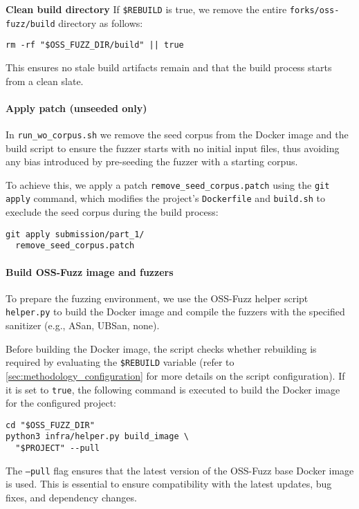\noindent \textbf{Clean build directory} If \texttt{\$REBUILD} is true, we remove the entire \texttt{forks/oss-fuzz/build} directory as follows:

\begin{verbatim}
rm -rf "$OSS_FUZZ_DIR/build" || true
\end{verbatim}

This ensures no stale build artifacts remain and that the build process starts from a clean slate.

\noindent \paragraph{Apply patch (unseeded only)} \label{sec:methodology_patching} In \texttt{run\_wo\_corpus.sh} we remove the seed corpus from the Docker image and the build script to ensure the fuzzer starts with no initial input files, thus avoiding any bias introduced by pre-seeding the fuzzer with a starting corpus.

To achieve this, we apply a patch \texttt{remove\_seed\_corpus.patch} using the \texttt{git apply} command, which modifies the project's \texttt{Dockerfile} and \texttt{build.sh} to execlude the seed corpus during the build process:

\begin{verbatim}
git apply submission/part_1/
  remove_seed_corpus.patch
\end{verbatim}

\noindent \paragraph{Build OSS-Fuzz image and fuzzers} To prepare the fuzzing environment, we use the OSS-Fuzz helper script \texttt{helper.py} to build the Docker image and compile the fuzzers with the specified sanitizer (e.g., ASan, UBSan, none).

Before building the Docker image, the script checks whether rebuilding is required by evaluating the \texttt{\$REBUILD} variable (refer to \autoref{sec:methodology_configuration} for more details on the script configuration). If it is set to \texttt{true}, the following command is executed to build the Docker image for the configured project:

\begin{verbatim}
cd "$OSS_FUZZ_DIR"
python3 infra/helper.py build_image \
  "$PROJECT" --pull
\end{verbatim}

The \texttt{---pull} flag ensures that the latest version of the OSS-Fuzz base Docker image is used. This is essential to ensure compatibility with the latest updates, bug fixes, and dependency changes.

